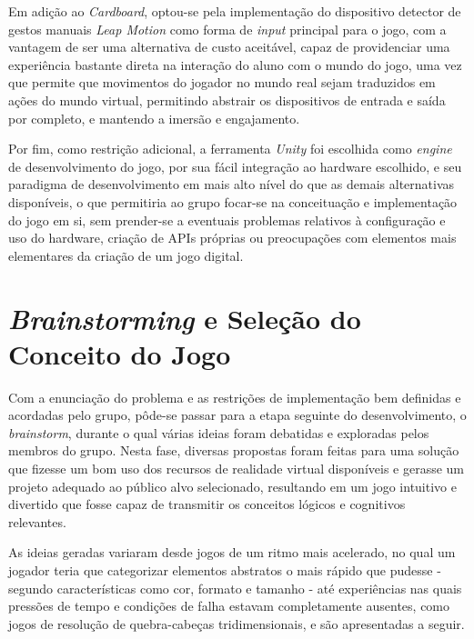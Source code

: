 Em adição ao \textit{Cardboard}, optou-se pela implementação do dispositivo 
detector de gestos manuais \textit{Leap Motion} como forma de \textit{input}
principal para o jogo, com a vantagem de ser uma alternativa de custo 
aceitável, capaz de providenciar uma experiência bastante direta na interação 
do aluno com o mundo do jogo, uma vez que permite que movimentos do jogador no 
mundo real sejam traduzidos em ações do mundo virtual, permitindo abstrair os 
dispositivos de entrada e saída por completo, e mantendo a imersão e engajamento.

Por fim, como restrição adicional, a ferramenta \textit{Unity} foi escolhida 
como \textit{engine} de desenvolvimento do jogo, por sua fácil integração 
ao hardware escolhido, e seu paradigma de desenvolvimento em mais alto nível do 
que as demais alternativas disponíveis, o que permitiria ao grupo focar-se 
na conceituação e implementação do jogo em si, sem prender-se a eventuais 
problemas relativos à configuração e uso do hardware, criação de APIs próprias 
ou preocupações com elementos mais elementares da criação de um jogo digital.

\section{\textit{Brainstorming} e Seleção do Conceito do Jogo}\label{sec-brainstorming-conceito}

Com a enunciação do problema e as restrições de implementação bem definidas 
e acordadas pelo grupo, pôde-se passar para a etapa seguinte do desenvolvimento, 
o \textit{brainstorm}, durante o qual várias ideias foram debatidas e 
exploradas pelos membros do grupo. Nesta fase, diversas propostas foram feitas 
para uma solução que fizesse um bom uso dos recursos de realidade 
virtual disponíveis e gerasse um projeto adequado ao público alvo 
selecionado, resultando em um jogo intuitivo e divertido que fosse 
capaz de transmitir os conceitos lógicos e cognitivos relevantes.

As ideias geradas variaram desde jogos de um ritmo mais acelerado, no qual 
um jogador teria que categorizar elementos abstratos o mais rápido que 
pudesse - segundo características como cor, formato e tamanho - até experiências 
nas quais pressões de tempo e condições de falha estavam completamente 
ausentes, como jogos de resolução de quebra-cabeças tridimensionais, 
e são apresentadas a seguir.

